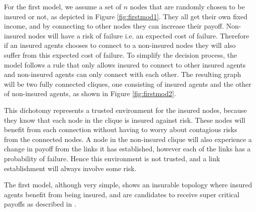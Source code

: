 For the first model, we assume a set of $n$ nodes that are randomly chosen to be insured or not, as depicted in Figure \ref{fig:firstmod1}. They all get their own fixed income, and by connecting to other nodes they can increase their payoff. Non-insured nodes will have a risk of failure i.e. an expected cost of failure. Therefore if an insured agents chooses to connect to a non-insured nodes they will also suffer from this expected cost of failure. To simplify the decision process, the model follows a rule that only allows insured to connect to other insured agents and non-insured agents can only connect with each other. The resulting graph will be two fully connected cliques, one consisting of insured agents and the other of non-insured agents, as shown in Figure  \ref{fig:firstmod2}. 

This dichotomy represents a trusted environment for the insured nodes, because they know that each node in the clique is insured against risk. These nodes will benefit from each connection without having to worry about contagious risks from the connected nodes. 
A node in the non-insured clique will also experience a change in payoff from the links it has established, however each of the links has a probability of failure. Hence this environment is not trusted, and a link establishment will always involve some risk. 

The first model, although very simple, shows an insurable topology where insured agents benefit from being insured, and are candidates to receive super critical payoffs as described in \cite{contagion}.

